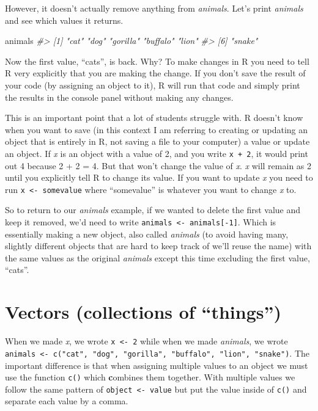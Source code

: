 \documentclass[
]{krantz}
\makeatletter
\newenvironment{Shaded}{\begin{snugshade}}{\end{snugshade}}
\newcommand{\CommentTok}[1]{\textcolor[rgb]{0.37,0.37,0.37}{\textit{#1}}}
\newcommand{\NormalTok}[1]{#1}
\newenvironment{kframe}{%
\medskip{}
\setlength{\fboxsep}{.8em}
 \def\at@end@of@kframe{}%
 \ifinner\ifhmode%
  \def\at@end@of@kframe{\end{minipage}}%
  \begin{minipage}{\columnwidth}%
 \fi\fi%
 \def\FrameCommand##1{\hskip\@totalleftmargin \hskip-\fboxsep
 \colorbox{shadecolor}{##1}\hskip-\fboxsep
     \hskip-\linewidth \hskip-\@totalleftmargin \hskip\columnwidth}%
 \MakeFramed {\advance\hsize-\width
   \@totalleftmargin\z@ \linewidth\hsize
   \@setminipage}}%
 {\par\unskip\endMakeFramed%
 \at@end@of@kframe}
\renewenvironment{Shaded}{\begin{kframe}}{\end{kframe}}
\makeatother
\begin{document}
However, it doesn't actually remove anything from \emph{animals}. Let's print \emph{animals} and see which values it returns.

\begin{Shaded}
\begin{Highlighting}[]
\NormalTok{animals}
\CommentTok{\#\textgreater{} [1] "cat"     "dog"     "gorilla" "buffalo" "lion"   }
\CommentTok{\#\textgreater{} [6] "snake"}
\end{Highlighting}
\end{Shaded}

Now the first value, ``cats'', is back. Why? To make changes in R you need to tell R very explicitly that you are making the change. If you don't save the result of your code (by assigning an object to it), R will run that code and simply print the results in the console panel without making any changes.

This is an important point that a lot of students struggle with. R doesn't know when you want to save (in this context I am referring to creating or updating an object that is entirely in R, not saving a file to your computer) a value or update an object. If \emph{x} is an object with a value of 2, and you write \texttt{x\ +\ 2}, it would print out 4 because 2 + 2 = 4. But that won't change the value of \emph{x}. \emph{x} will remain as 2 until you explicitly tell R to change its value. If you want to update \emph{x} you need to run \texttt{x\ \textless{}-\ somevalue} where ``somevalue'' is whatever you want to change \emph{x} to.

So to return to our \emph{animals} example, if we wanted to delete the first value and keep it removed, we'd need to write \texttt{animals\ \textless{}-\ animals{[}-1{]}}. Which is essentially making a new object, also called \emph{animals} (to avoid having many, slightly different objects that are hard to keep track of we'll reuse the name) with the same values as the original \emph{animals} except this time excluding the first value, ``cats''.

\hypertarget{vectors}{%
\section{Vectors (collections of ``things'')}\label{vectors}}

When we made \emph{x}, we wrote \texttt{x\ \textless{}-\ 2} while when we made \emph{animals}, we wrote \texttt{animals\ \textless{}-\ c("cat",\ "dog",\ "gorilla",\ "buffalo",\ "lion",\ "snake")}. The important difference is that when assigning multiple values to an object we must use the function \texttt{c()} which \textbf{c}ombines them together. With multiple values we follow the same pattern of \texttt{object\ \textless{}-\ value} but put the value inside of \texttt{c()} and separate each value by a comma.
\end{document}
